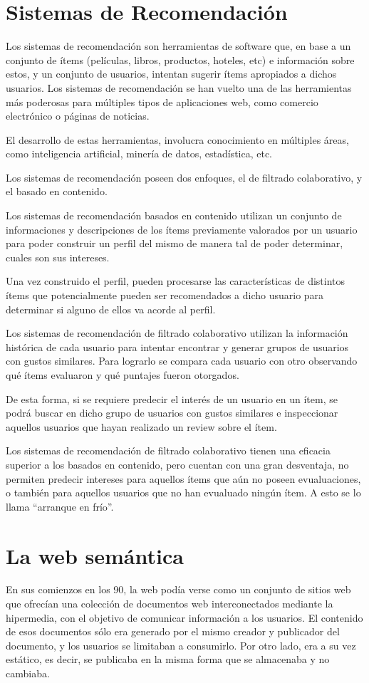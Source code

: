 \section{Sistemas de Recomendación}
\label{section:sistemas-de-recomendacion}
Los sistemas de recomendación son herramientas de software que, en base a un conjunto de ítems (películas, libros, productos, hoteles, etc) e información sobre estos, y un conjunto de usuarios, intentan sugerir ítems apropiados a dichos usuarios. Los sistemas de recomendación se han vuelto una de las herramientas más poderosas para múltiples tipos de aplicaciones web, como comercio electrónico o páginas de noticias. 

El desarrollo de estas herramientas, involucra conocimiento en múltiples áreas, como inteligencia artificial, minería de datos, estadística, etc. 

Los sistemas de recomendación poseen dos enfoques, el de filtrado colaborativo, y el basado en contenido.

Los sistemas de recomendación basados en contenido utilizan un conjunto de informaciones y descripciones de los ítems previamente valorados por un usuario para poder construir un perfil del mismo de manera tal de poder determinar, cuales son sus intereses.

Una vez construido el perfil, pueden procesarse las características de distintos ítems que potencialmente pueden ser recomendados a dicho usuario para determinar si alguno de ellos va acorde al perfil.

Los sistemas de recomendación de filtrado colaborativo utilizan la información histórica de cada usuario para intentar encontrar y generar grupos de usuarios con gustos similares. Para lograrlo se compara cada usuario con otro observando qué ítems evaluaron y qué puntajes fueron otorgados. 

De esta forma, si se requiere predecir el interés de un usuario en un ítem, se podrá buscar en dicho grupo de usuarios con gustos similares e inspeccionar aquellos usuarios que hayan realizado un review sobre el ítem.

Los sistemas de recomendación de filtrado colaborativo tienen una eficacia superior a los basados en contenido, pero cuentan con una gran desventaja, no permiten predecir intereses para aquellos ítems que aún no poseen evualuaciones, o también para aquellos usuarios que no han evualuado ningún ítem.  A esto se lo llama “arranque en frío”.

\section{La web semántica}
\label{section:la-web-semantica}
En sus comienzos en los 90, la web podía verse como un conjunto de sitios web que ofrecían una colección de documentos web interconectados mediante la hipermedia, con el objetivo de comunicar información a los usuarios.
El contenido de esos documentos sólo era generado por el mismo creador y publicador del documento, y los usuarios se limitaban a consumirlo. Por otro lado, era a su vez estático, es decir, se publicaba en la misma forma que se almacenaba y no cambiaba.  

